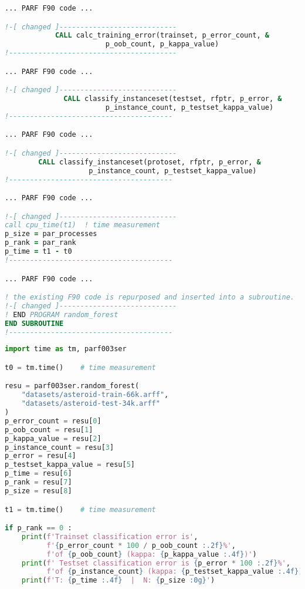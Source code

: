 \begin{lstlisting}[language=Fortran, caption={Serial F2PY implementation of the RF test case - F90 module code.}]
... PARF F90 code ...

!-[ changed ]----------------------------
            CALL calc_training_error(trainset, p_error_count, &
                        p_oob_count, p_kappa_value)
!----------------------------------------

... PARF F90 code ...

!-[ changed ]----------------------------
              CALL classify_instanceset(testset, rfptr, p_error, &
                        p_instance_count, p_testset_kappa_value)
!---------------------------------------

... PARF F90 code ...

!-[ changed ]----------------------------
        CALL classify_instanceset(protoset, rfptr, p_error, &
                    p_instance_count, p_testset_kappa_value)
!---------------------------------------

... PARF F90 code ...

!-[ changed ]----------------------------
call cpu_time(t1)  ! time measurement
p_size = par_processes
p_rank = par_rank
p_time = t1 - t0
!---------------------------------------

... PARF F90 code ...

! the existing F90 code is repurposed and inserted into a subroutine.
!-[ changed ]----------------------------
! END PROGRAM random_forest
END SUBROUTINE
!---------------------------------------
\end{lstlisting}




\begin{lstlisting}[language=Python, caption={Serial F2PY implementation of the RF test case - Python main code.}]
import time as tm, parf003ser

t0 = tm.time()    # time measurement

resu = parf003ser.random_forest(
    "datasets/asteroid-train-66k.arff",
    "datasets/asteroid-test-34k.arff"
)
p_error_count = resu[0]
p_oob_count = resu[1]
p_kappa_value = resu[2]
p_instance_count = resu[3]
p_error = resu[4]
p_testset_kappa_value = resu[5]
p_time = resu[6]
p_rank = resu[7]
p_size = resu[8]

t1 = tm.time()    # time measurement

if p_rank == 0 :
    print(f'Trainset classification error is',
          f'{p_error_count * 100 / p_oob_count :.2f}%',
          f'of {p_oob_count} (kappa: {p_kappa_value :.4f})')
    print(f' Testset classification error is {p_error * 100 :.2f}%',
          f'of {p_instance_count} (kappa: {p_testset_kappa_value :.4f})')
    print(f'T: {p_time :.4f}  |  N: {p_size :0g}')
\end{lstlisting}




